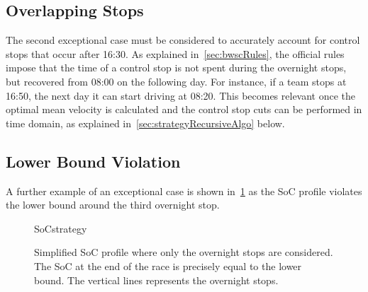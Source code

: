 \subsection{Overlapping Stops}
\label{sec:strategyOverlapStops}
The second exceptional case must be considered to accurately account for control stops that occur after 16:30. As explained in~\cref{sec:bwscRules}, the official rules impose that the time of a control stop is not spent during the overnight stops, but recovered from 08:00 on the following day. For instance, if a team stops at 16:50, the next day it can start driving at 08:20. This becomes relevant once the optimal mean velocity is calculated and the control stop cuts can be performed in time domain, as explained in~\cref{sec:strategyRecursiveAlgo} below. 


\subsection{Lower Bound Violation}
\label{sec:strategyLBviolation}
A further example of an exceptional case is shown in~\cref{fig:strategySoC} as the SoC profile violates the lower bound around the third overnight stop.
\begin{figure}[htbp]
	\centering
	\begin{externalize}{SoCstrategy}
		
	\end{externalize}
	\caption{Simplified SoC profile where only the overnight stops are considered. The SoC at the end of the race is precisely equal to the lower bound. The vertical lines represents the overnight stops.}
	\label{fig:strategySoC}
\end{figure}

